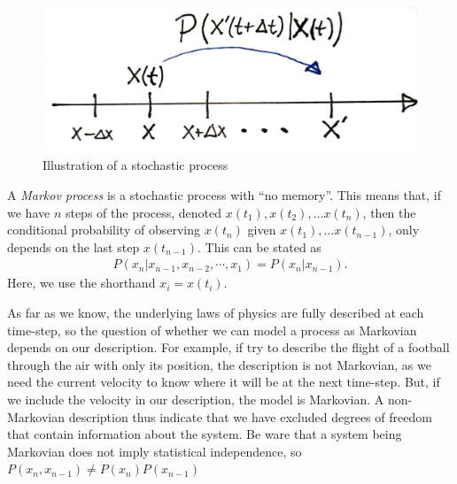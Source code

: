 \begin{figure}[!htb]
    \centering
    \includegraphics[width=.4\textwidth]{fig/fig1.jpg}
    \caption{Illustration of a stochastic process}
    \label{fig: stochastic process}
\end{figure}


A \emph{Markov process} is a stochastic process with ``no memory''.
This means that, if we have $n$ steps of the process, denoted $x(t_1), x(t_2), \dots x(t_n)$, then the conditional probability of observing $x(t_n)$ given $x(t_1), \dots x(t_{n-1})$, only depends on the last step $x(t_{n-1})$.
This can be stated as
%
\begin{align}
    P(x_n |x_{n-1}, x_{n-2}, \cdots, x_1) = P(x_n | x_{n-1}).
\end{align}
%
Here, we use the shorthand $x_i = x(t_i)$.

As far as we know, the underlying laws of physics are fully described at each time-step, so the question of whether we can model a process as Markovian depends on our description.
For example, if try to describe the flight of a football through the air with only its position, the description is not Markovian, as we need the current velocity to know where it will be at the next time-step.
But, if we include the velocity in our description, the model is Markovian.
A non-Markovian description thus indicate that we have excluded degrees of freedom that contain information about the system.
Be ware that a system being Markovian does not imply statistical independence, so $P(x_{n}, x_{n-1})\neq P(x_n)P(x_{n-1})$


